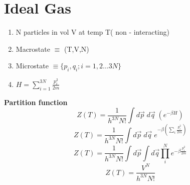 \section{Ideal Gas} 
\begin{enumerate}
    \item N particles in vol V at temp T( non - interacting)
    \item Macrostate \(\equiv \) (T,V,N)
    \item Microstate \(\equiv \{p_i,q_i ; i =1,2\ldots 3N \}\) 
    \item \(H = \sum\limits_{i=1}^{3N}\frac{p_i ^2}{2m} \) 
\end{enumerate}
\textbf{Partition function} 
\[
    Z(T) = \frac{1}{h^{3N} N!} \int d\vec{p} \; d\vec{q} \; (e^{-\beta H})
\]
\[
    Z(T) = \frac{1}{h^{3N} N! } \int d\vec{p} \; d\vec{q} \; e^{-\beta (\sum\limits_{i} \frac{p_i ^2}{2m} )}
\]
\[
    Z(T) = \frac{1}{h^{3N} N! } \int d\vec{p} \int d\vec{q} \prod\limits_{i}^{N} e^{-\beta \frac{p_i ^2}{2m}}
\]
\[
    Z(T) = \frac{V^N}{h^{3N} N! } 
\]